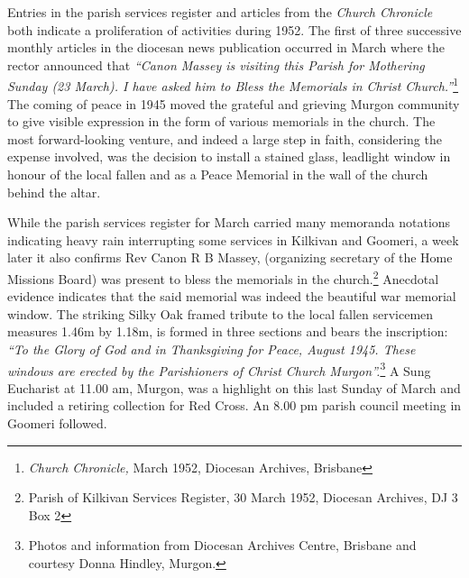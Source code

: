 Entries in the parish services register and articles from the \emph{Church Chronicle} both indicate a proliferation of activities during 1952. The first of three successive monthly articles in the diocesan news publication occurred in March where the rector announced that \emph{``Canon Massey is visiting this Parish for Mothering Sunday (23 March). I have asked him to Bless the Memorials in Christ Church.''}\footnote{\emph{Church Chronicle,} March 1952, Diocesan Archives, Brisbane} The coming of peace in 1945 moved the grateful and grieving Murgon community to give visible expression in the form of various memorials in the church. The most forward-looking venture, and indeed a large step in faith, considering the expense involved, was the decision to install a stained glass, leadlight window in honour of the local fallen and as a Peace Memorial in the wall of the church behind the altar.


While the parish services register for March carried many memoranda notations indicating heavy rain interrupting some services in Kilkivan and Goomeri, a week later it also confirms Rev Canon R B Massey, (organizing secretary of the Home Missions Board) was present to bless the memorials in the church.\footnote{Parish of Kilkivan Services Register, 30 March 1952, Diocesan Archives, DJ 3 Box 2} Anecdotal evidence indicates that the said memorial was indeed the beautiful war memorial window. The striking Silky Oak framed tribute to the local fallen servicemen measures 1.46m by 1.18m, is formed in three sections and bears the inscription: \emph{``To the Glory of God and in Thanksgiving for Peace, August 1945. These windows are erected by the Parishioners of Christ Church Murgon''.}\footnote{Photos and information from Diocesan Archives Centre, Brisbane and courtesy Donna Hindley, Murgon.} A Sung Eucharist at 11.00 am, Murgon, was a highlight on this last Sunday of March and included a retiring collection for Red Cross. An 8.00 pm parish council meeting in Goomeri followed.








